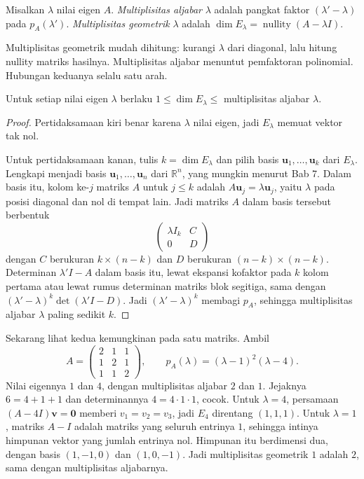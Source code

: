 \begin{definisi}
Misalkan $\lambda$ nilai eigen $A$. \emph{Multiplisitas aljabar} $\lambda$ adalah pangkat faktor
$(\lambda'-\lambda)$ pada $p_{A}(\lambda')$. \emph{Multiplisitas geometrik} $\lambda$ adalah
$\dim E_{\lambda}=\operatorname{nullity}(A-\lambda I)$.
\end{definisi}

Multiplisitas geometrik mudah dihitung: kurangi $\lambda$ dari diagonal, lalu hitung nullity
matriks hasilnya. Multiplisitas aljabar menuntut pemfaktoran polinomial. Hubungan keduanya selalu
satu arah.

\begin{lemma}
Untuk setiap nilai eigen $\lambda$ berlaku
$1\le\dim E_{\lambda}\le$ multiplisitas aljabar $\lambda$.
\end{lemma}

\begin{proof}
Pertidaksamaan kiri benar karena $\lambda$ nilai eigen, jadi $E_{\lambda}$ memuat vektor tak nol.

Untuk pertidaksamaan kanan, tulis $k=\dim E_{\lambda}$ dan pilih basis
$\mathbf{u}_{1},\dots,\mathbf{u}_{k}$ dari $E_{\lambda}$. Lengkapi menjadi basis
$\mathbf{u}_{1},\dots,\mathbf{u}_{n}$ dari $\mathbb{R}^{n}$, yang mungkin menurut Bab 7. Dalam
basis itu, kolom ke-$j$ matriks $A$ untuk $j\le k$ adalah $A\mathbf{u}_{j}=\lambda\mathbf{u}_{j}$,
yaitu $\lambda$ pada posisi diagonal dan nol di tempat lain. Jadi matriks $A$ dalam basis tersebut
berbentuk
\[
  \begin{pmatrix}\lambda I_{k}&C\\ 0&D\end{pmatrix}
\]
dengan $C$ berukuran $k\times(n-k)$ dan $D$ berukuran $(n-k)\times(n-k)$. Determinan
$\lambda' I-A$ dalam basis itu, lewat ekspansi kofaktor pada $k$ kolom pertama atau lewat rumus
determinan matriks blok segitiga, sama dengan $(\lambda'-\lambda)^{k}\det(\lambda' I-D)$. Jadi
$(\lambda'-\lambda)^{k}$ membagi $p_{A}$, sehingga multiplisitas aljabar $\lambda$ paling sedikit
$k$.
\end{proof}

Sekarang lihat kedua kemungkinan pada satu matriks. Ambil
\[
  A=\begin{pmatrix}2&1&1\\ 1&2&1\\ 1&1&2\end{pmatrix},\qquad
  p_{A}(\lambda)=(\lambda-1)^{2}(\lambda-4).
\]
Nilai eigennya $1$ dan $4$, dengan multiplisitas aljabar $2$ dan $1$. Jejaknya $6=4+1+1$ dan
determinannya $4=4\cdot1\cdot1$, cocok. Untuk $\lambda=4$, persamaan $(A-4I)\mathbf{v}=
\mathbf{0}$ memberi $v_{1}=v_{2}=v_{3}$, jadi $E_{4}$ direntang $(1,1,1)$. Untuk $\lambda=1$,
matriks $A-I$ adalah matriks yang seluruh entrinya $1$, sehingga intinya himpunan vektor yang
jumlah entrinya nol. Himpunan itu berdimensi dua, dengan basis $(1,-1,0)$ dan $(1,0,-1)$. Jadi
multiplisitas geometrik $1$ adalah $2$, sama dengan multiplisitas aljabarnya.

